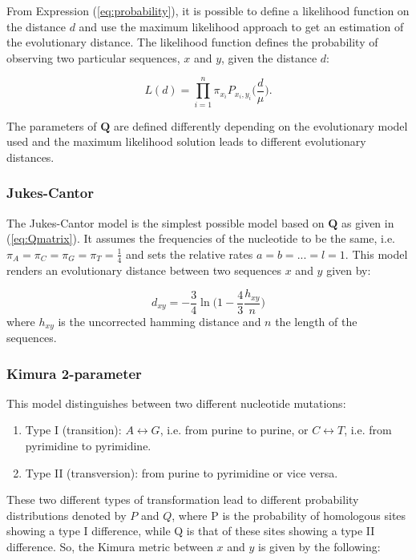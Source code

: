 From Expression (\ref{eq:probability}), it is possible to define a likelihood function on the distance $d$ and use the maximum likelihood approach to get an estimation of the evolutionary distance. The likelihood function defines the probability of observing two particular sequences, $x$ and $y$, given the distance $d$:

$$L(d) = \prod_{i=1}^n \pi_{x_i}P_{x_i, y_i}\Big(\frac{d}{\mu}\Big).$$

The parameters of $\mathbf{Q}$ are defined differently depending on the evolutionary model used and the maximum likelihood solution leads to different evolutionary distances. 

\subsubsection{Jukes-Cantor}\label{JK_model}

The Jukes-Cantor model \cite{JC69} is the simplest possible model based on $\mathbf{Q}$ as given in (\ref{eq:Qmatrix}). It assumes the frequencies of the nucleotide to be the same, i.e. $\pi_A = \pi_C = \pi_G = \pi_T = \frac{1}{4}$ and sets the relative rates $a=b= ... = l = 1$. This model renders an evolutionary distance between two sequences $x$ and $y$ given by:

\begin{equation}
d_{xy} = -\frac{3}{4}\ln \bigg(1- \frac{4}{3}\frac{h_{xy}}{n}\bigg)
\label{eq:JC_distance}
\end{equation}
where $h_{xy}$ is the uncorrected hamming distance and $n$ the length of the sequences.

\subsubsection{Kimura 2-parameter}\label{K2P_model}

This model \cite{K80} distinguishes between two different nucleotide mutations:

\begin{enumerate}
    \item Type I (transition): $A\leftrightarrow G$, i.e. from purine to purine, or $C\leftrightarrow T$, i.e. from pyrimidine to pyrimidine.
    \item Type II (transversion): from purine to pyrimidine or vice versa.
\end{enumerate}

These two different types of transformation lead to different probability distributions denoted by $P$ and $Q$, where P is the probability of homologous sites showing a type I difference, while Q is that of these sites showing a type II difference. So, the Kimura \cite{K80} metric between $x$ and $y$ is given by the following:

